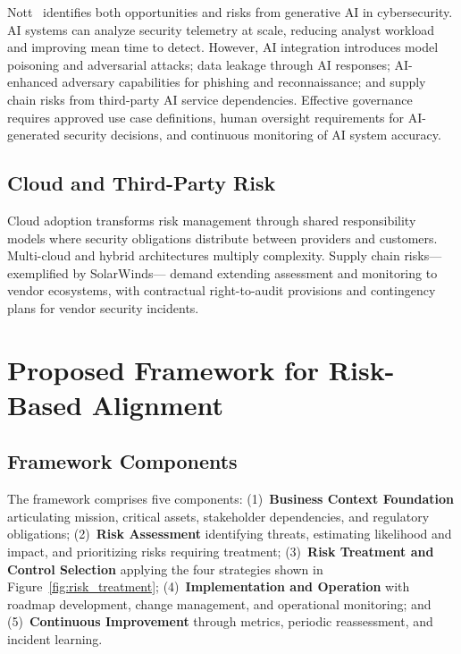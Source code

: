 \documentclass[journal]{IEEEtran}
\begin{document}
Nott~\cite{nott2025organizational} identifies both opportunities and risks from generative
AI in cybersecurity. AI systems can analyze security telemetry at scale, reducing analyst
workload and improving mean time to detect. However, AI integration introduces model
poisoning and adversarial attacks; data leakage through AI responses; AI-enhanced
adversary capabilities for phishing and reconnaissance; and supply chain risks from
third-party AI service dependencies. Effective governance requires approved use case
definitions, human oversight requirements for AI-generated security decisions, and
continuous monitoring of AI system accuracy.

\subsection{Cloud and Third-Party Risk}

Cloud adoption transforms risk management through shared responsibility models where
security obligations distribute between providers and customers. Multi-cloud and hybrid
architectures multiply complexity. Supply chain risks---exemplified by SolarWinds---
demand extending assessment and monitoring to vendor ecosystems, with contractual
right-to-audit provisions and contingency plans for vendor security incidents.

\section{Proposed Framework for Risk-Based Alignment}

\subsection{Framework Components}

The framework comprises five components: (1)~\textbf{Business Context Foundation}
articulating mission, critical assets, stakeholder dependencies, and regulatory
obligations; (2)~\textbf{Risk Assessment} identifying threats, estimating likelihood and
impact, and prioritizing risks requiring treatment; (3)~\textbf{Risk Treatment and Control
Selection} applying the four strategies shown in Figure~\ref{fig:risk_treatment};
(4)~\textbf{Implementation and Operation} with roadmap development, change management,
and operational monitoring; and (5)~\textbf{Continuous Improvement} through metrics,
periodic reassessment, and incident learning.
\end{document}
